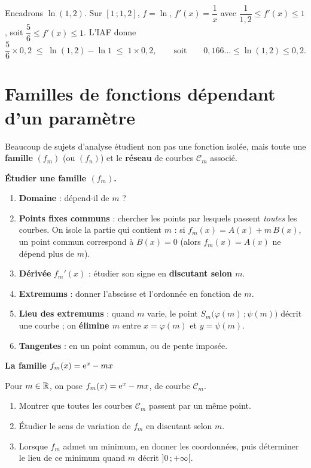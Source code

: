 \begin{exemple}
	Encadrons $\ln(1{,}2)$. Sur $[1\,;1{,}2]$, $f=\ln$, $f'(x)=\dfrac1x$ avec
	$\dfrac{1}{1{,}2}\leq f'(x)\leq 1$, soit $\dfrac{5}{6}\leq f'(x)\leq 1$.
	L'IAF donne
	\[
	\frac{5}{6}\times 0{,}2 \;\leq\; \ln(1{,}2)-\ln 1 \;\leq\; 1\times 0{,}2,
	\qquad\text{soit}\qquad
	0{,}166\ldots \leq \ln(1{,}2)\leq 0{,}2.
	\]
\end{exemple}


\section{Familles de fonctions dépendant d'un paramètre}

Beaucoup de sujets d'analyse étudient non pas une fonction isolée, mais toute
une \textbf{famille} $(f_m)$ (ou $(f_n)$) et le \textbf{réseau} de courbes
$\mathcal C_m$ associé.

\begin{methode}
	\textbf{Étudier une famille $(f_m)$.}
	\begin{enumerate}
		\item \textbf{Domaine} : dépend-il de $m$ ?
		\item \textbf{Points fixes communs} : chercher les points par lesquels
		passent \emph{toutes} les courbes. On isole la partie qui contient $m$ :
		si $f_m(x)=A(x)+m\,B(x)$, un point commun correspond à $B(x)=0$
		(alors $f_m(x)=A(x)$ ne dépend plus de $m$).
		\item \textbf{Dérivée} $f_m'(x)$ : étudier son signe en \textbf{discutant
		selon $m$}.
		\item \textbf{Extremums} : donner l'abscisse et l'ordonnée en fonction
		de $m$.
		\item \textbf{Lieu des extremums} : quand $m$ varie, le point
		$S_m\bigl(\varphi(m)\,;\psi(m)\bigr)$ décrit une courbe ; on
		\textbf{élimine $m$} entre $x=\varphi(m)$ et $y=\psi(m)$.
		\item \textbf{Tangentes} : en un point commun, ou de pente imposée.
	\end{enumerate}
\end{methode}

\exerciceresolu
\textbf{La famille $f_m(x)=\mathrm{e}^{x}-m x$}

Pour $m\in\mathbb{R}$, on pose $f_m(x)=\mathrm{e}^{x}-mx$, de courbe $\mathcal C_m$.
\begin{enumerate}
	\item Montrer que toutes les courbes $\mathcal C_m$ passent par un même point.
	\item Étudier le sens de variation de $f_m$ en discutant selon $m$.
	\item Lorsque $f_m$ admet un minimum, en donner les coordonnées, puis
	déterminer le lieu de ce minimum quand $m$ décrit $]0\,;+\infty[$.
\end{enumerate}

